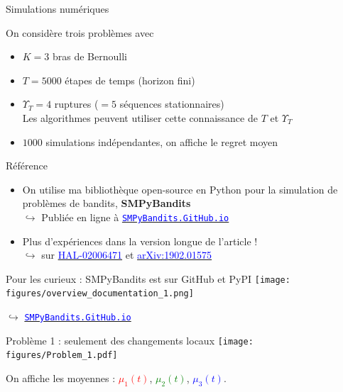 \documentclass[11pt,french,ignorenonframetext,]{beamer}
\begin{document}
\begin{frame}{Simulations numériques}

  \begin{block}{On considère trois problèmes avec}
    \begin{itemize}
      \item
      $K=3$ bras de Bernoulli
      \item
      $T=5000$ étapes de temps (horizon fini)
      \item
      $\Upsilon_T=4$ ruptures ($=5$ séquences stationnaires)\\
      Les algorithmes peuvent utiliser cette connaissance de $T$ et $\Upsilon_T$
      \item
      $1000$ simulations indépendantes, on affiche le regret moyen
    \end{itemize}
  \end{block}

  \pause

  \begin{exampleblock}{Référence}
    \begin{itemize}
      \item
      On utilise ma bibliothèque open-source en Python pour la simulation de problèmes de bandits, \textbf{SMPyBandits}
      \\
      $\hookrightarrow$ Publiée en ligne à \href{https://SMPyBandits.GitHub.io}{\textcolor{blue}{\texttt{SMPyBandits.GitHub.io}}}
      \item
      Plus d'expériences dans la version longue de l'article !\\
      $\hookrightarrow$ sur
      \href{https://hal.inria.fr/hal-02006471}{\textcolor{blue}{HAL-02006471}}
      et
      \href{https://arxiv.org/abs/1902.01575}{\textcolor{blue}{arXiv:1902.01575}}
    \end{itemize}
  \end{exampleblock}

\end{frame}

\begin{frame}[plain]{Pour les curieux : SMPyBandits est sur GitHub et PyPI}
  \centering
  \texttt{[image: figures/overview\_documentation\_1.png]}

  $\hookrightarrow$ \href{https://SMPyBandits.GitHub.io}{\textcolor{blue}{\texttt{SMPyBandits.GitHub.io}}}
\end{frame}



\begin{frame}[plain]{Problème 1 : seulement des changements locaux}
  \centering
  \texttt{[image: figures/Problem\_1.pdf]}

  On affiche les moyennes :
  \textcolor{red}{$\mu_1(t)$},
  \textcolor{green}{$\mu_2(t)$},
  \textcolor{blue}{$\mu_3(t)$}.
\end{frame}
\end{document}
